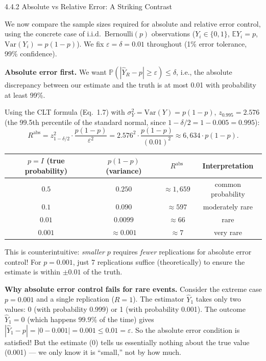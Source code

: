 \documentclass[aspectratio=169,10pt]{beamer}
\begin{document}
\begin{frame}[allowframebreaks]{4.4.2 Absolute vs Relative Error: A Striking Contrast}

We now compare the sample sizes required for absolute and relative error control,
using the concrete case of i.i.d.\ Bernoulli$(p)$ observations
($Y_i \in \{0, 1\}$, $\mathbb{E}Y_i = p$, $\mathrm{Var}(Y_i) = p(1-p)$).
We fix $\varepsilon = \delta = 0.01$ throughout (1\% error tolerance, 99\%
confidence).

\medskip
\textbf{Absolute error first.}
We want $\mathbb{P}(|\hat{Y}_R - p| \geq \varepsilon) \leq \delta$, i.e., the
absolute discrepancy between our estimate and the truth is at most 0.01 with
probability at least 99\%.

Using the CLT formula (Eq.\ 1.7) with $\sigma_Y^2 = \mathrm{Var}(Y) = p(1-p)$,
$z_{0.995} = 2.576$ (the 99.5th percentile of the standard normal, since
$1 - \delta/2 = 1 - 0.005 = 0.995$):
\[
  R^{\mathrm{abs}} = z_{1-\delta/2}^2 \cdot \frac{p(1-p)}{\varepsilon^2}
    = 2.576^2 \cdot \frac{p(1-p)}{(0.01)^2}
    \approx 6{,}634 \cdot p(1-p).
\]

\begin{center}
  \begin{tabular}{cccc}
    \toprule
    $p = I$ (true probability) & $p(1-p)$ (variance) & $R^{\mathrm{abs}}$ & Interpretation \\
    \midrule
    $0.5$   & $0.250$  & $\approx 1{,}659$  & common probability \\
    $0.1$   & $0.090$  & $\approx 597$     & moderately rare \\
    $0.01$  & $0.0099$ & $\approx 66$      & rare \\
    $0.001$ & $\approx 0.001$ & $\approx 7$ & very rare \\
    \bottomrule
  \end{tabular}
\end{center}

This is counterintuitive: \emph{smaller} $p$ requires \emph{fewer} replications
for absolute error control!  For $p = 0.001$, just 7 replications suffice
(theoretically) to ensure the estimate is within $\pm 0.01$ of the truth.

\framebreak

\textbf{Why absolute error control fails for rare events.}
Consider the extreme case $p = 0.001$ and a single replication ($R = 1$).
The estimator $\hat{Y}_1$ takes only two values: 0 (with probability 0.999)
or 1 (with probability 0.001).  The outcome $\hat{Y}_1 = 0$ (which happens
$99.9\%$ of the time) gives $|\hat{Y}_1 - p| = |0 - 0.001| = 0.001 \leq 0.01 = \varepsilon$.
So the absolute error condition is satisfied!  But the estimate (0) tells us
essentially nothing about the true value (0.001) --- we only know it is
``small,'' not by how much.


\end{frame}
\end{document}
